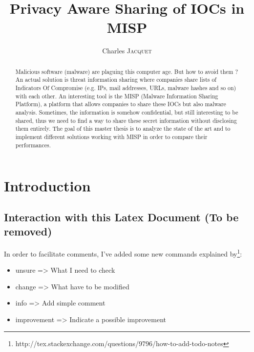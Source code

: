\documentclass{eplmastersthesis}
\title{Privacy Aware Sharing of IOCs in MISP}	%
\author{Charles \textsc{Jacquet}}	%
\begin{document}
\maketitle					%
\thispagestyle{empty}		%


\begin{abstract} 
Malicious software (malware) are plaguing this computer age. But how to avoid them ?
An actual solution is threat information sharing where companies share lists of Indicators Of Compromise (e.g. IPs, mail addresses, URLs, malware hashes and so on) with each other.
An interesting tool is the MISP (Malware Information Sharing Platform), a platform that allows companies to share these IOCs but also malware analysis.
Sometimes, the information is somehow confidential, but still interesting to be shared, thus we need to find a way to share these secret information without disclosing them entirely.
The goal of this master thesis is to analyze the state of the art and to implement different solutions working with MISP in order to compare their performances.
\end{abstract}

\tableofcontents

\chapter{Introduction}
\section{Interaction with this Latex Document (To be removed)}
In order to facilitate comments, I've added some new commands explained by\footnote{http://tex.stackexchange.com/questions/9796/how-to-add-todo-notes}:\\
\begin{itemize}
\item unsure => What I need to check
\item change => What have to be modified
\item info => Add simple comment
\item improvement => Indicate a possible improvement
\end{itemize}
\end{document}

